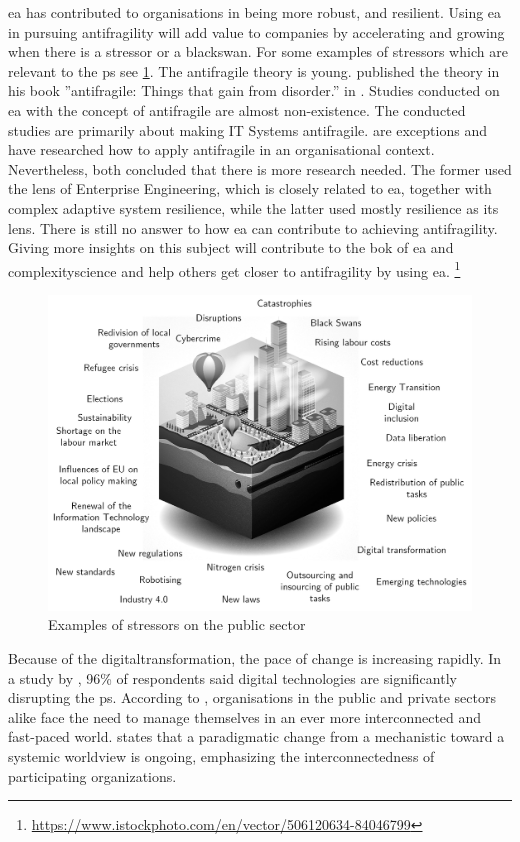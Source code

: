 \acrshort{ea} has contributed to organisations in being more \gls{robust}, and \gls{resilient}. Using \acrshort{ea} in pursuing \gls{antifragility} will add value to companies by accelerating and growing when there is a \gls{stressor} or a \gls{blackswan}. For some examples of \glspl{stressor} which are relevant to the \gls{ps} see \cref{fig:publicstressors}. The \gls{antifragile} theory is young. \citeauthor{Taleb2012} published the theory in his book ''\Gls{antifragile}: Things that gain from disorder.'' in \citeyear{Taleb2012}. Studies conducted on \acrshort{ea} with the concept of \gls{antifragile} are almost non-existence. The conducted studies are primarily about making IT Systems \gls{antifragile}. \textcites{Botjes2020}{Kastner2017} are exceptions and have researched how to apply \gls{antifragile} in an organisational context. Nevertheless, both concluded that there is more research needed. The former used the lens of Enterprise Engineering, which is closely related to \acrshort{ea}, together with complex adaptive system resilience, while the latter used mostly resilience as its lens. There is still no answer to how \acrshort{ea} can contribute to achieving \gls{antifragility}. Giving more insights on this subject will contribute to the \acrshort{bok} of \acrshort{ea} and \gls{complexityscience} and help others get closer to \gls{antifragility} by using \acrshort{ea}.
{\let\thefootnote\relax\footnote{{\url{https://www.istockphoto.com/en/vector/506120634-84046799}}}}
\begin{figure}[H]
	\centering
	\includegraphics[width=0.8\linewidth]{images/publicstressors}
	\caption[Examples of stressors on the public sector]{Examples of stressors on the public sector}
	\label{fig:publicstressors}
\end{figure}
Because of the \gls{digitaltransformation}, the pace of change is increasing rapidly. In a study by \textcite{Eggers2015}, 96\% of respondents said digital technologies are significantly disrupting the \gls{ps}. According to \textcite{Nurmi2021}, organisations in the public and private sectors alike face the need to manage themselves in an ever more interconnected and fast-paced world. \textcite{Guggenberger2020} states that a paradigmatic change from a mechanistic toward a systemic worldview is ongoing, emphasizing the interconnectedness of participating organizations. 

